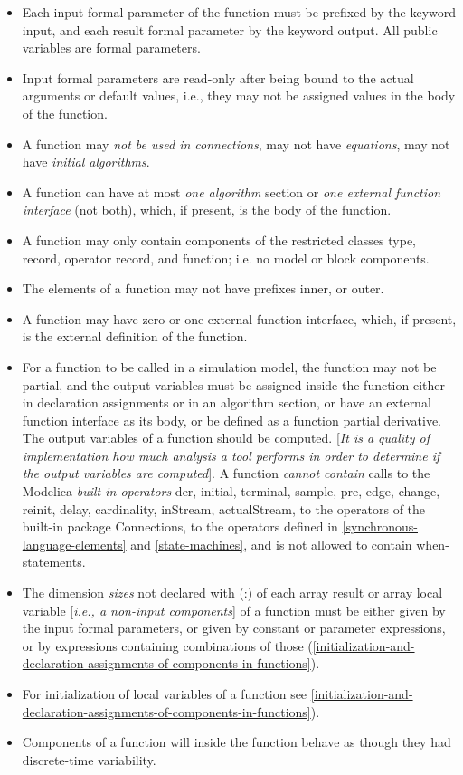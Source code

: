 \documentclass[10pt,a4paper]{report}
\begin{document}
\begin{itemize}
\item
  Each input formal parameter of the function must be prefixed by the
  keyword input, and each result formal parameter by the keyword output.
  All public variables are formal parameters.
\item
  Input formal parameters are read-only after being bound to the actual
  arguments or default values, i.e., they may not be assigned values in
  the body of the function.
\item
  A function may \emph{not be used in connections}, may not have
  \emph{equations}, may not have \emph{initial algorithms}.
\item
  A function can have at most \emph{one algorithm} section or \emph{one
  external function interface} (not both), which, if present, is the
  body of the function.
\item
  A function may only contain components of the restricted classes type,
  record, operator record, and function; i.e. no model or block
  components.
\item
  The elements of a function may not have prefixes inner, or outer.
\item
  A function may have zero or one external function interface, which, if
  present, is the external definition of the function.
\item
  For a function to be called in a simulation model, the function may
  not be partial, and the output variables must be assigned inside the
  function either in declaration assignments or in an algorithm section,
  or have an external function interface as its body, or be defined as a
  function partial derivative. The output variables of a function should
  be computed. {[}\emph{It is a quality of implementation how much
  analysis a tool performs in order to determine if the output variables
  are computed}{]}. A function \emph{cannot contain} calls to the
  Modelica \emph{built-in operators} der, initial, terminal, sample,
  pre, edge, change, reinit, delay, cardinality, inStream, actualStream,
  to the operators of the built-in package Connections, to the operators
  defined in \ref{synchronous-language-elements} and \ref{state-machines}, and is not allowed to contain
  when-statements.
\item
  The dimension \emph{sizes} not declared with (:) of each array result
  or array local variable {[}\emph{i.e., a non-input components}{]} of a
  function must be either given by the input formal parameters, or given
  by constant or parameter expressions, or by expressions containing
  combinations of those (\ref{initialization-and-declaration-assignments-of-components-in-functions}).
\item
  For initialization of local variables of a function see \ref{initialization-and-declaration-assignments-of-components-in-functions}).
\item
  Components of a function will inside the function behave as though
  they had discrete-time variability.
\end{itemize}
\end{document}
